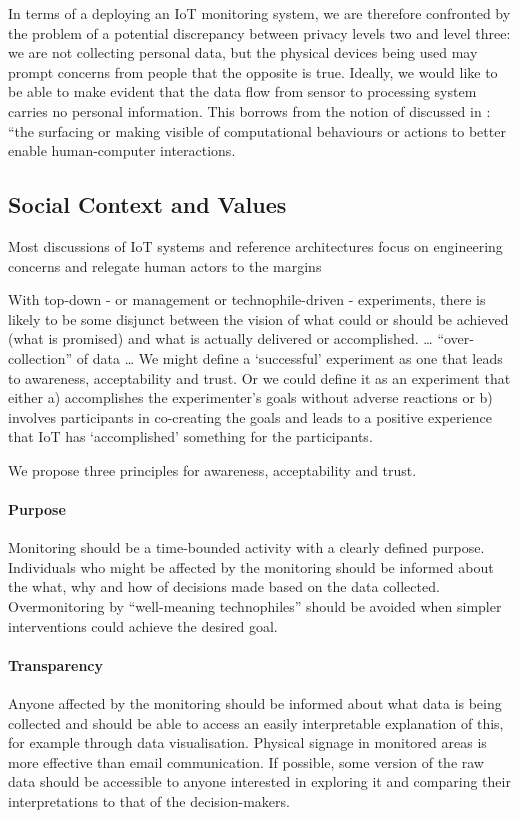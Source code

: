 In terms of a deploying an IoT monitoring system, we are therefore
confronted by the problem of a potential discrepancy between privacy
levels two and level three: we are not collecting personal data, but
the physical devices being used may prompt concerns from people that
the opposite is true. Ideally, we would like to be able to make
evident that the data flow from sensor to processing system carries no
personal information. This borrows from the notion of
 discussed in
\cite{Crabtree-2016-BAIT}: ``the surfacing or making visible of
computational behaviours or actions to better enable human-computer interactions.

\subsection{Social Context and Values}
\label{sec:social-context}

Most discussions of IoT systems and reference architectures \cite{Puschel-2016-WIAS} focus on
engineering concerns and relegate human
actors to the margins 



With top-down - or management or technophile-driven - experiments,
there is likely to be some disjunct between the vision of what could
or should be achieved (what is promised) and what is actually
delivered or accomplished. … “over-collection” of data 
…
We might define a ‘successful’ experiment as one that leads to
awareness, acceptability and trust. Or we could define it as an
experiment that either a) accomplishes the experimenter’s goals
without adverse reactions or b) involves participants in co-creating
the goals and leads to a positive experience that IoT has
‘accomplished’ something for the participants.  

We propose three principles for awareness, acceptability and trust.

\paragraph{Purpose} Monitoring should be a time-bounded activity with
a clearly defined purpose. Individuals who might be affected by the
monitoring should be informed about the what, why and how of decisions
made based on the data collected. Overmonitoring by “well-meaning
technophiles” should be avoided when simpler interventions could
achieve the desired goal. 

\paragraph{Transparency} Anyone affected by the monitoring should be
informed about what data is being collected and should be able to
access an easily interpretable explanation of this, for example
through data visualisation. Physical signage in monitored areas is
more effective than email communication. If possible, some version of
the raw data should be accessible to anyone interested in exploring it
and comparing their interpretations to that of the decision-makers. 

